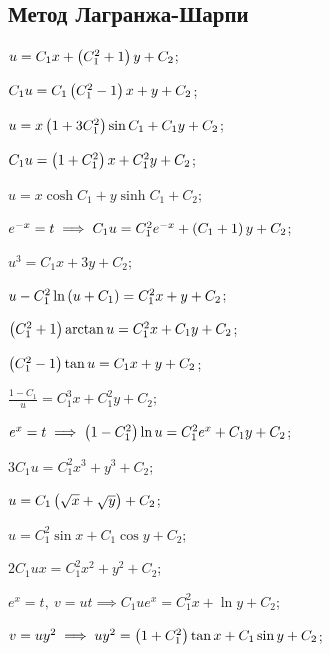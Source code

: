 \subsection*{Метод Лагранжа-Шарпи}

	\begin{enumsols}

		\item \( u = C_1 x + \left( C_1^2 + 1 \right) y + C_2 \); \sfill %
		\item \( C_1 u = C_1 \left( C_1^2 - 1 \right) x + y + C_2 \); \sfill %
		\item \( u = x \left( 1 + 3C_1^2 \right) \sin{C_1} + C_1 y + C_2 \); \sfill %
		\item \( C_1 u = \left( 1 + C_1^2 \right) x + C_1^2 y + C_2 \); \sfill %
		\item \( u = x \cosh{C_1} + y \sinh{C_1} + C_2 \); \sfill %
		\item \( e^{-x} = t \implies C_1 u = C_1^2 e^{-x} + \left( C_1 + 1 \right) y + C_2 \); \sfill %
		\item \( u^3 = C_1 x + 3y + C_2 \); \sfill %
		\item \( u - C_1^2 \ln\left( u + C_1 \right) = C_1^2 x + y + C_2 \); \sfill %
		\item \( \left( C_1^2 + 1 \right) \arctan{u} = C_1^2 x + C_1 y + C_2 \); \sfill %
		\item \( \left( C_1^2 - 1 \right) \tan{u} = C_1 x + y + C_2 \); \sfill %
		\item \( \frac{1 - C_1}{u} = C_1^3 x + C_1^2 y + C_2 \); \sfill %
		\item \( e^{x} = t \implies \left( 1 - C_1^2 \right) \ln{u} = C_1^2 e^{x} + C_1 y + C_2 \); \sfill %
		\item \( 3C_1 u = C_1^2 x^3 + y^3 + C_2 \); \sfill %
		\item \( u = C_1 \left( \sqrt{x} + \sqrt{y} \right) + C_2 \); \sfill %
		\item \( u = C_1^2 \sin{x} + C_1 \cos{y} + C_2 \); \sfill %
		\item \( 2C_1 ux = C_1^2 x^2 + y^2 + C_2 \); \sfill %
		\item \( e^x = t, ~ v = ut \implies C_1 ue^x = C_1^2 x + \ln{y} + C_2 \); \sfill %
		\item \( v = uy^2 \implies uy^2 = \left( 1 + C_1^2 \right) \tan{x} + C_1 \sin{y} + C_2 \); \sfill %


\end{enumsols}
